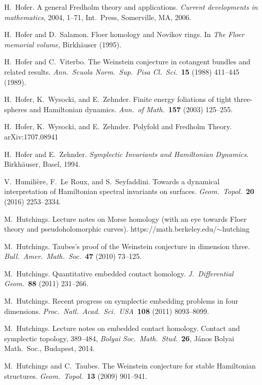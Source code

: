 \documentclass[12pt,twoside]{amsart}
\theoremstyle{plain}
\numberwithin{figure}{section}
\numberwithin{equation}{section}
\begin{document}
\begin{thebibliography}{999}
H.\ Hofer.
A general Fredholm theory and applications. 
{\it Current developments in mathematics}, 2004, 1--71, 
Int.\ Press, Somerville, MA, 2006.

H.\ Hofer and D.\ Salamon.
Floer homology and {N}ovikov rings. 
In {\it The Floer memorial volume}, Birkh\"auser (1995).

H.\ Hofer and C.\ Viterbo.
The Weinstein conjecture in cotangent bundles and related results. 
{\it Ann.\ Scuola Norm.\ Sup.\ Pisa Cl.\ Sci.}~{\bf 15} (1988) 411--445 (1989).

H.\ Hofer, K.\ Wysocki, and E.\ Zehnder. 
Finite energy foliations of tight three-spheres and Hamiltonian dynamics. 
{\it Ann.\ of Math.}~{\bf 157} (2003) 125--255. 

H.\ Hofer, K.\ Wysocki, and E.\ Zehnder. 
Polyfold and Fredholm Theory.    
arXiv:1707.08941


H.\ Hofer and E.\ Zehnder. 
{\it Symplectic Invariants and Hamiltonian Dynamics}. 
Birkh\"auser, Basel, 1994.

V.\ Humili\`ere, F.\ Le Roux, and S.\ Seyfaddini.
Towards a dynamical interpretation of Hamiltonian spectral invariants on surfaces. 
{\it Geom.\ Topol.}~{\bf 20} (2016) 2253--2334. 

M.\ Hutchings.
Lecture notes on Morse homology 
(with an eye towards Floer theory and pseudoholomorphic curves).
https://math.berkeley.edu/$\sim$hutching

M.\ Hutchings.
Taubes's proof of the Weinstein conjecture in dimension three. 
{\it Bull.\ Amer.\ Math.\ Soc.}~{\bf 47} (2010) 73--125.

M.\ Hutchings. 
Quantitative embedded contact homology. 
{\it J.\ Differential Geom.}~{\bf 88} (2011) 231--266.

M.\ Hutchings.
Recent progress on symplectic embedding problems in four dimensions. 
{\it Proc.\ Natl.\ Acad.\ Sci.\ USA}~{\bf 108} (2011) 8093--8099.

M.\ Hutchings.
Lecture notes on embedded contact homology. Contact and symplectic topology, 389--484, 
{\it Bolyai Soc.\ Math.\ Stud.}~{\bf 26}, J\'anos Bolyai Math.\ Soc., Budapest, 2014.

M.\ Hutchings and C.\ Taubes. 
The Weinstein conjecture for stable Hamiltonian structures. 
{\it Geom.\ Topol.}~{\bf 13} (2009) 901--941. 


\end{thebibliography}
\end{document}
